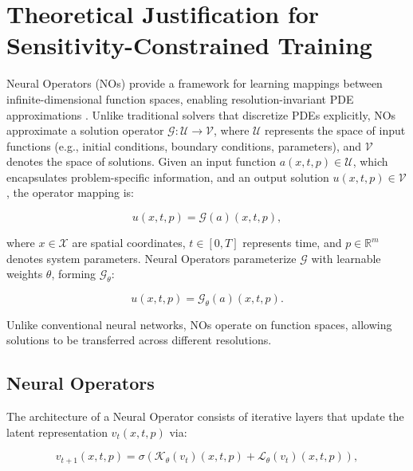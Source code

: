 \section{Theoretical Justification for Sensitivity-Constrained Training}
\label{sec_sup_method}

\renewcommand{\thefigure}{A.\arabic{figure}}  %
\renewcommand{\thetable}{A.\arabic{table}}  %


Neural Operators (NOs) provide a framework for learning mappings between infinite-dimensional function spaces, enabling resolution-invariant PDE approximations \citep{lu2021learning, kovachki2023neural}. Unlike traditional solvers that discretize PDEs explicitly, NOs approximate a solution operator \( \mathcal{G}: \mathcal{U} \to \mathcal{V} \), where \( \mathcal{U} \) represents the space of input functions (e.g., initial conditions, boundary conditions, parameters), and \( \mathcal{V} \) denotes the space of solutions. Given an input function \( a(x, t, p) \in \mathcal{U} \), which encapsulates problem-specific information, and an output solution \( u(x, t, p) \in \mathcal{V} \), the operator mapping is:

\begin{equation}
u(x, t, p) = \mathcal{G}(a)(x, t, p),
\end{equation}

where \( x \in \mathcal{X} \) are spatial coordinates, \( t \in [0, T] \) represents time, and \( p \in \mathbb{R}^m \) denotes system parameters. Neural Operators parameterize \( \mathcal{G} \) with learnable weights \( \theta \), forming \( \mathcal{G}_\theta \):

\begin{equation}
u(x, t, p) = \mathcal{G}_\theta(a)(x, t, p).
\end{equation}

Unlike conventional neural networks, NOs operate on function spaces, allowing solutions to be transferred across different resolutions.

\subsection*{Neural Operators}
The architecture of a Neural Operator consists of iterative layers that update the latent representation \( v_t(x, t, p) \) via:

\begin{equation}
v_{t+1}(x, t, p) = \sigma \left( \mathcal{K}_\theta(v_t)(x, t, p) + \mathcal{L}_\theta(v_t)(x, t, p) \right),
\end{equation}

